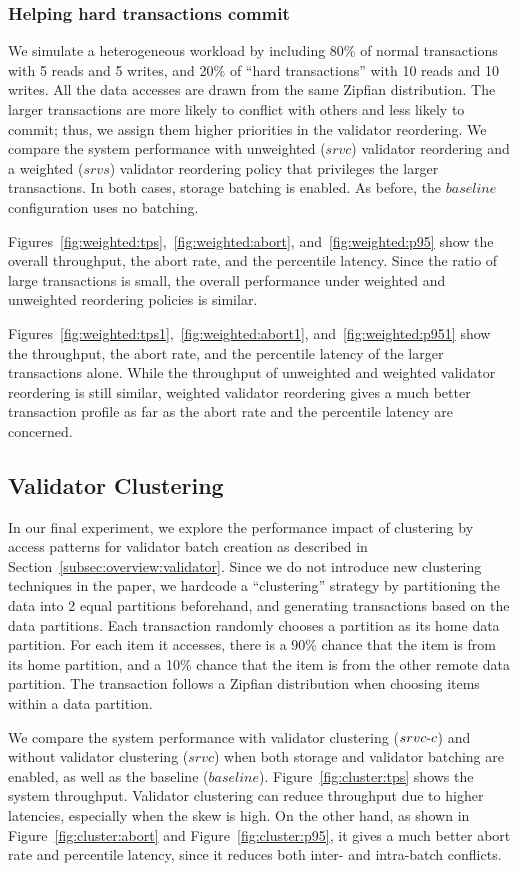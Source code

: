 \subsubsection{Helping hard transactions commit}

We simulate a heterogeneous workload by including 80\% of normal transactions with 5 reads and 5 writes, and 20\% of ``hard transactions'' with 10 reads and 10 writes. All the data accesses are drawn from the same Zipfian distribution. The larger transactions are more likely to conflict with others and less likely to commit; thus, we assign them higher priorities in the validator reordering. We compare the system performance with unweighted ($srvc$) validator reordering and a weighted ($srvs$) validator reordering policy that privileges the larger transactions. In both cases, storage batching is enabled. As before, the $baseline$ configuration uses no batching.


Figures~\ref{fig:weighted:tps},~\ref{fig:weighted:abort}, and~\ref{fig:weighted:p95} show the overall throughput, the abort rate, and the percentile latency. Since the ratio of large transactions is small, the overall performance under weighted and unweighted reordering policies is similar.

Figures~\ref{fig:weighted:tps1},~\ref{fig:weighted:abort1}, and~\ref{fig:weighted:p951} show the throughput, the abort rate, and the percentile latency of the larger transactions alone. While the throughput of unweighted and weighted validator reordering is still similar, weighted validator reordering gives a much better transaction profile as far as the abort rate and the percentile latency are concerned.


\subsection{Validator Clustering}


In our final experiment, we explore the performance impact of clustering by access patterns for validator batch creation as described in Section~\ref{subsec:overview:validator}. Since we do not introduce new clustering techniques in the paper, we hardcode a ``clustering'' strategy by partitioning the data into 2 equal partitions beforehand, and generating transactions based on the data partitions. Each transaction randomly chooses a partition as its home data partition. For each item it accesses, there is a 90\% chance that the item is from its home partition, and a 10\% chance that the item is from the other remote data partition. The transaction follows a Zipfian distribution when choosing items within a data partition.

We compare the system performance with validator clustering ($srvc\hbox{-}c$) and without validator clustering ($srvc$) when both storage and validator batching are enabled, as well as the baseline ($baseline$). Figure~\ref{fig:cluster:tps} shows the system throughput. Validator clustering can reduce throughput due to higher latencies, especially when the skew is high. On the other hand, as shown in Figure~\ref{fig:cluster:abort} and Figure~\ref{fig:cluster:p95}, it gives a much better abort rate and percentile latency, since it reduces both inter- and intra-batch conflicts. 


